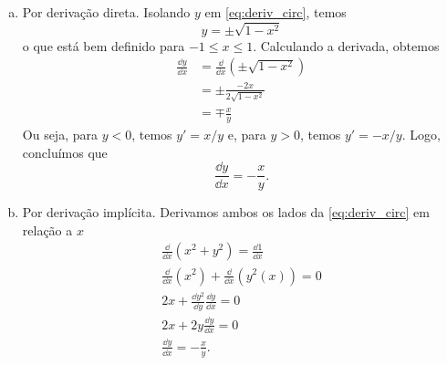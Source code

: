 \begin{ex}
  \begin{enumerate}[a)]
  \item Por derivação direta. Isolando $y$ em \eqref{eq:deriv_circ}, temos
    \begin{equation}
      y = \pm \sqrt{1 - x^2}
    \end{equation}
    o que está bem definido para $-1\leq x \leq 1$. Calculando a derivada, obtemos
    \begin{align}
      \frac{\dd y}{\dd x} &= \frac{\dd}{\dd x}\left(\pm\sqrt{1 - x^2}\right)\\
                          &= \pm\frac{-2x}{2\sqrt{1-x^2}}\\
                          &= \mp \frac{x}{y}
    \end{align}
    Ou seja, para $y < 0$, temos $y' = x/y$ e, para $y>0$, temos $y' = -x/y$. Logo, concluímos que
    \begin{equation}
      \frac{\dd y}{\dd x} = -\frac{x}{y}.
    \end{equation}
  \item Por derivação implícita. Derivamos ambos os lados da \eqref{eq:deriv_circ} em relação a $x$
    \begin{gather}
      \frac{\dd}{\dd x}\left(x^2+y^2\right) = \frac{\dd 1}{\dd x} \\
      \frac{\dd}{\dd x}\left(x^2\right) + \frac{\dd}{\dd x}\left(y^2(x)\right) = 0\\
      2x + \frac{\dd y^2}{\dd y}\frac{\dd y}{\dd x} = 0\\
      2x + 2y\frac{\dd y}{\dd x} = 0\\
      \frac{\dd y}{\dd x} = -\frac{x}{y}.
    \end{gather}
  \end{enumerate}
\end{ex}

